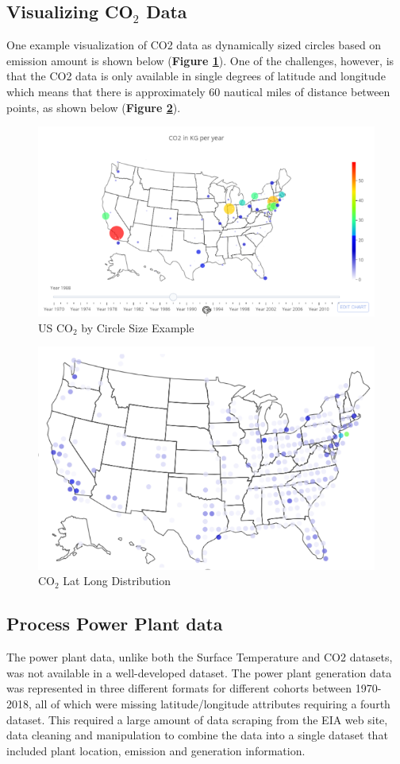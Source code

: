 \documentclass[sigconf,nonacm=true]{acmart}
\begin{document}
\subsection{Visualizing CO$_2$ Data}
One example visualization of CO2 data as dynamically sized circles based on emission amount is shown below (\textbf{Figure \ref{fig:co2dots}}).  One of the challenges, however, is that the CO2 data is only available in single degrees of latitude and longitude which means that there is approximately 60 nautical miles of distance between points, as shown below (\textbf{Figure \ref{fig:co2lat}}).    
\begin{figure}[H]
	\centering
	\includegraphics[width=0.9\linewidth]{images/co2Dots}
	\caption{US CO$_2$ by Circle Size Example}
	\label{fig:co2dots}
\end{figure}

\begin{figure}[H]
	\centering
	\includegraphics[width=0.8\linewidth]{images/co2lat}
	\caption{CO$_2$ Lat Long Distribution}
	\label{fig:co2lat}
\end{figure}
\subsection{Process Power Plant data}
The power plant data, unlike both the Surface Temperature and CO2 datasets, was not available in a well-developed dataset.  The power plant generation data was represented in three different formats for different cohorts between 1970-2018, all of which were missing latitude/longitude attributes requiring a fourth dataset. This required a large amount of data scraping from the EIA web site, data cleaning and manipulation to combine the data into a single dataset that included plant location, emission and generation information.   \\
\end{document}
